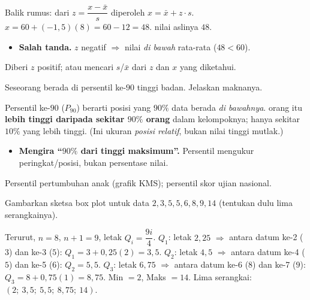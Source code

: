 \jawab
{} Balik rumus: dari $z=\dfrac{x-\bar x}{s}$ diperoleh
$x=\bar x+z\cdot s$.
 $x=60+(-1{,}5)(8)=60-12=48$.
\jadi nilai aslinya $48$.

\begin{jebakan}
\begin{itemize}[leftmargin=*,topsep=2pt]
  \item \textbf{Salah tanda.} $z$ negatif $\Rightarrow$ nilai \emph{di bawah}
  rata-rata ($48<60$).
\end{itemize}
\end{jebakan}

\begin{variasi}
Diberi $z$ positif; atau mencari $s$/$\bar x$ dari $z$ dan $x$ yang diketahui.
\end{variasi}

\begin{soalbox}{}
Seseorang berada di persentil ke-$90$ tinggi badan. Jelaskan maknanya.
\end{soalbox}

\jawab
{} Persentil ke-$90$ ($P_{90}$) berarti posisi yang $90\%$ data berada
\emph{di bawahnya}.
\jadi orang itu \textbf{lebih tinggi daripada sekitar $90\%$ orang} dalam
kelompoknya; hanya sekitar $10\%$ yang lebih tinggi. (Ini ukuran \emph{posisi
relatif}, bukan nilai tinggi mutlak.)

\begin{jebakan}
\begin{itemize}[leftmargin=*,topsep=2pt]
  \item \textbf{Mengira ``$90\%$ dari tinggi maksimum''.} Persentil mengukur
  peringkat/posisi, bukan persentase nilai.
\end{itemize}
\end{jebakan}

\begin{variasi}
Persentil pertumbuhan anak (grafik KMS); persentil skor ujian nasional.
\end{variasi}

\begin{soalbox}{}
Gambarkan sketsa box plot untuk data $2,3,5,5,6,8,9,14$ (tentukan dulu lima
serangkainya).
\end{soalbox}

\jawab
{} Terurut, $n=8$, $n+1=9$, letak $Q_i=\dfrac{9i}{4}$.
 $Q_1$: letak $2{,}25$ $\Rightarrow$ antara datum ke-2 ($3$) dan
ke-3 ($5$): $Q_1=3+0{,}25(2)=3{,}5$.
$Q_2$: letak $4{,}5$ $\Rightarrow$ antara datum ke-4 ($5$) dan ke-5 ($6$):
$Q_2=5{,}5$.
$Q_3$: letak $6{,}75$ $\Rightarrow$ antara datum ke-6 ($8$) dan ke-7 ($9$):
$Q_3=8+0{,}75(1)=8{,}75$.
 Min $=2$, Maks $=14$. Lima serangkai: $(2;\ 3{,}5;\ 5{,}5;\ 8{,}75;\
14)$.

